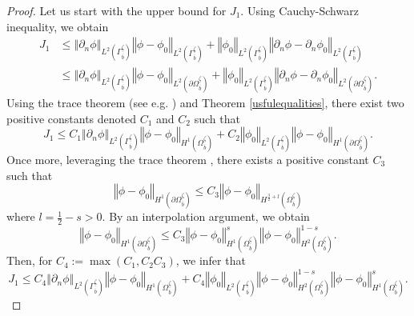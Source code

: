\documentclass[11pt]{article}
\begin{document}
\begin{proof}
	Let us start with the upper bound for $J_1$. Using Cauchy-Schwarz inequality, we obtain 
	\begin{equation*}
		\begin{split}
			J_1&\leq \left\Vert \partial_n \phi\right\Vert_{L^{2}(\Gamma_{\overline{b}}^{\underline{\zeta}} )}\left\Vert  \phi-\phi_0\right\Vert_{L^{2}(\Gamma_{\overline{b}}^{\underline{\zeta}} )}+\left\Vert  \phi_0\right\Vert_{L^{2}(\Gamma_{\overline{b}}^{\underline{\zeta}} )}\left\Vert \partial_n\phi-\partial_n\phi_0 \right\Vert_{L^{2}(\Gamma_{\overline{b}}^{\underline{\zeta}} )}\\
			&\leq \left\Vert \partial_n \phi\right\Vert_{L^{2}(\Gamma_{\overline{b}}^{\underline{\zeta}} )}\left\Vert  \phi-\phi_0\right\Vert_{L^{2}(\partial\Omega_{\overline{b}}^{\underline{\zeta}} )}+\left\Vert  \phi_0\right\Vert_{L^{2}(\Gamma_{\overline{b}}^{\underline{\zeta}} )}\left\Vert \partial_n\phi-\partial_n\phi_0 \right\Vert_{L^{2}(\partial\Omega_{\overline{b}}^{\underline{\zeta}} )}.
		\end{split}
	\end{equation*}
	Using  the trace theorem (see e.g. \cite{grisvard2011elliptic}) and Theorem \ref{usfulequalities},  there exist two positive constants denoted $C_1$ and $C_2$ such that 
	$$J_1\leq C_1 \left\Vert \partial_n \phi\right\Vert_{L^{2}(\Gamma_{\overline{b}}^{\underline{\zeta}} )}\left\Vert  \phi-\phi_0\right\Vert_{H^{1}(\Omega_{\overline{b}}^{\underline{\zeta}} )}+C_2\left\Vert  \phi_0\right\Vert_{L^{2}(\Gamma_{\overline{b}}^{\underline{\zeta}} )}\left\Vert \phi-\phi_0 \right\Vert_{H^{1}(\partial\Omega_{\overline{b}}^{\underline{\zeta}} )}.$$
	Once more, leveraging the trace theorem \cite{ding1996proof}, there exists a positive constant $C_3$ such that 
	$$\left\Vert \phi-\phi_0 \right\Vert_{H^{1}(\partial\Omega_{\overline{b}}^{\underline{\zeta}} )}\leq C_3 \left\Vert \phi-\phi_0 \right\Vert_{H^{\frac{3}{2}+l}(\Omega_{\overline{b}}^{\underline{\zeta}} )}$$
	where $l=\frac{1}{2}-s>0$. By an interpolation argument, we obtain 
	$$\left\Vert \phi-\phi_0 \right\Vert_{H^{1}(\partial\Omega_{\overline{b}}^{\underline{\zeta}} )}\leq C_3 \left\Vert \phi-\phi_0 \right\Vert^s_{H^{1}(\Omega_{\overline{b}}^{\underline{\zeta}} )}\left\Vert \phi-\phi_0 \right\Vert^{1-s}_{H^{2}(\Omega_{\overline{b}}^{\underline{\zeta}} )}.$$
	Then, for  $C_4:=\max(C_1,C_2C_3)$, we infer that
	\begin{equation}\label{I1upperbound}
		J_1\leq C_4 \left\Vert \partial_n \phi\right\Vert_{L^{2}(\Gamma_{\overline{b}}^{\underline{\zeta}} )}\left\Vert  \phi-\phi_0\right\Vert_{H^{1}(\Omega_{\overline{b}}^{\underline{\zeta}} )}+C_4\left\Vert  \phi_0\right\Vert_{L^{2}(\Gamma_{\overline{b}}^{\underline{\zeta}} )}\left\Vert \phi-\phi_0 \right\Vert^{1-s}_{H^{2}(\Omega_{\overline{b}}^{\underline{\zeta}} )}\left\Vert \phi-\phi_0 \right\Vert^s_{H^{1}(\Omega_{\overline{b}}^{\underline{\zeta}} )}.

\end{equation}
\end{proof}
\end{document}
